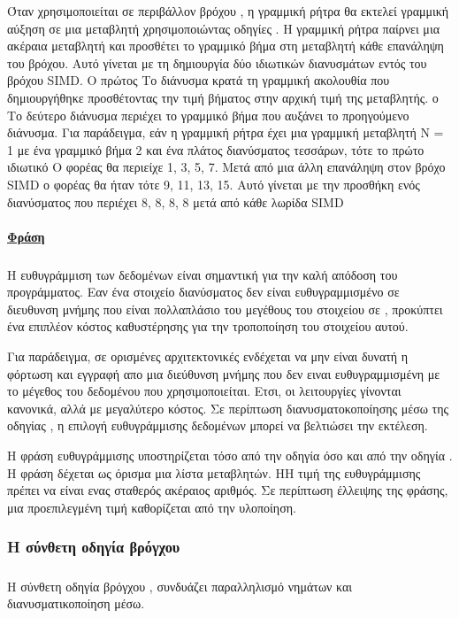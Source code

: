 Όταν χρησιμοποιείται σε περιβάλλον βρόχου , η γραμμική ρήτρα θα εκτελεί γραμμική αύξηση σε μια μεταβλητή
χρησιμοποιώντας οδηγίες . Η γραμμική ρήτρα παίρνει μια ακέραια μεταβλητή και προσθέτει το γραμμικό βήμα στη
μεταβλητή κάθε επανάληψη του βρόχου. Αυτό γίνεται με τη δημιουργία δύο ιδιωτικών διανυσμάτων εντός του βρόχου SIMD. Ο
πρώτος Το διάνυσμα κρατά τη γραμμική ακολουθία που δημιουργήθηκε προσθέτοντας την τιμή βήματος στην αρχική τιμή της
μεταβλητής. ο Το δεύτερο διάνυσμα περιέχει το γραμμικό βήμα που αυξάνει το προηγούμενο διάνυσμα. Για παράδειγμα, εάν η
γραμμική ρήτρα έχει μια γραμμική μεταβλητή N = 1 με ένα γραμμικό βήμα 2 και ένα πλάτος διανύσματος τεσσάρων, τότε το
πρώτο ιδιωτικό Ο φορέας θα περιείχε 1, 3, 5, 7. Μετά από μια άλλη επανάληψη στον βρόχο SIMD ο φορέας θα ήταν τότε 9, 11,
13, 15. Αυτό γίνεται με την προσθήκη ενός διανύσματος που περιέχει 8, 8, 8, 8 μετά από κάθε λωρίδα SIMD


\paragraph{\underline{Φράση }}
\subparagraph{}
Η ευθυγράμμιση των δεδομένων είναι σημαντική για την καλή απόδοση του προγράμματος. Εαν ένα στοιχείο διανύσματος δεν
είναι ευθυγραμμισμένο σε διευθυνση μνήμης που είναι πολλαπλάσιο του μεγέθους του στοιχείου σε \emph{},
προκύπτει ένα επιπλέον κόστος καθυστέρησης για την τροποποίηση του στοιχείου αυτού.

Για παράδειγμα, σε ορισμένες αρχιτεκτονικές ενδέχεται να μην είναι δυνατή η φόρτωση και εγγραφή απο μια διεύθυνση μνήμης
που δεν ειναι ευθυγραμμισμένη με το μέγεθος του δεδομένου που χρησιμοποιείται. Ετσι, οι λειτουργίες γίνονται κανονικά,
αλλά με μεγαλύτερο κόστος. Σε περίπτωση διανυσματοκοποίησης μέσω της οδηγίας \emph{}, η επιλογή ευθυγράμμισης
δεδομένων μπορεί να βελτιώσει την εκτέλεση.

Η φράση ευθυγράμμισης υποστηρίζεται τόσο από την οδηγία \emph{} όσο και από την οδηγία \emph{}. Η φράση δέχεται ως όρισμα μια λίστα μεταβλητών. ΗΗ τιμή της ευθυγράμμισης πρέπει να είναι ενας σταθερός ακέραιος
αριθμός. Σε περίπτωση έλλειψης της φράσης, μια προεπιλεγμένη τιμή καθορίζεται από την υλοποίηση.

\clearpage
\subsubsection{Η σύνθετη οδηγία βρόγχου \emph{}}
\subparagraph{}
Η σύνθετη οδηγία βρόγχου \emph{}, συνδυάζει παραλληλισμό νημάτων και διανυσματικοποίηση μέσω\emph{}.

